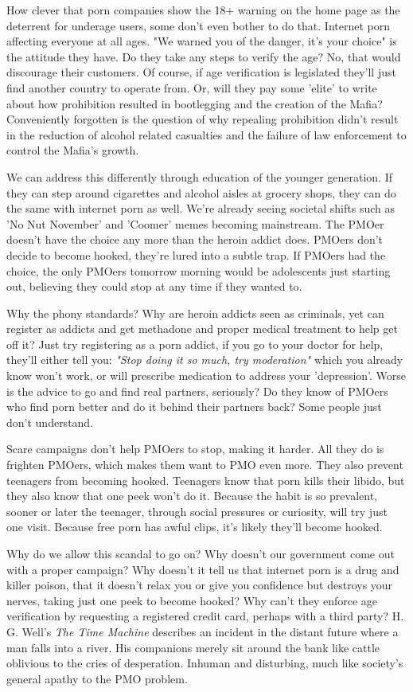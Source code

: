 \documentclass[easypeasy.tex]{subfiles}
\begin{document}
How clever that porn companies show the 18+ warning on the home page as the deterrent for underage users, some don't even bother to do that. Internet porn affecting everyone at all ages. "We warned you of the danger, it's your choice" is the attitude they have. Do they take any steps to verify the age? No, that would discourage their customers. Of course, if age verification is legislated they'll just find another country to operate from. Or, will they pay some 'elite' to write about how prohibition resulted in bootlegging and the creation of the Mafia? Conveniently forgotten is the question of why repealing prohibition didn't result in the reduction of alcohol related casualties and the failure of law enforcement to control the Mafia's growth.

We can address this differently through education of the younger generation. If they can step around cigarettes and alcohol aisles at grocery shops, they can do the same with internet porn as well. We're already seeing societal shifts such as 'No Nut November' and 'Coomer' memes becoming mainstream. The PMOer doesn't have the choice any more than the heroin addict does. PMOers don't decide to become hooked, they're lured into a subtle trap. If PMOers had the choice, the only PMOers tomorrow morning would be adolescents just starting out, believing they could stop at any time if they wanted to.

Why the phony standards? Why are heroin addicts seen as criminals, yet can register as addicts and get methadone and proper medical treatment to help get off it? Just try registering as a porn addict, if you go to your doctor for help, they'll either tell you: \textit{"Stop doing it so much, try moderation"} which you already know won't work, or will prescribe medication to address your 'depression'. Worse is the advice to go and find real partners, seriously? Do they know of PMOers who find porn better and do it behind their partners back? Some people just don't understand.

Scare campaigns don't help PMOers to stop, making it harder. All they do is frighten PMOers, which makes them want to PMO even more. They also prevent teenagers from becoming hooked. Teenagers know that porn kills their libido, but they also know that one peek won't do it. Because the habit is so prevalent, sooner or later the teenager, through social pressures or curiosity, will try just one visit. Because free porn has awful clips, it's likely they'll become hooked.

Why do we allow this scandal to go on? Why doesn't our government come out with a proper campaign? Why doesn't it tell us that internet porn is a drug and killer poison, that it doesn't relax you or give you confidence but destroys your nerves, taking just one peek to become hooked? Why can't they enforce age verification by requesting a registered credit card, perhaps with a third party? H. G. Well's \textit{The Time Machine} describes an incident in the distant future where a man falls into a river. His companions merely sit around the bank like cattle oblivious to the cries of desperation. Inhuman and disturbing, much like society's general apathy to the PMO problem.
\end{document}
